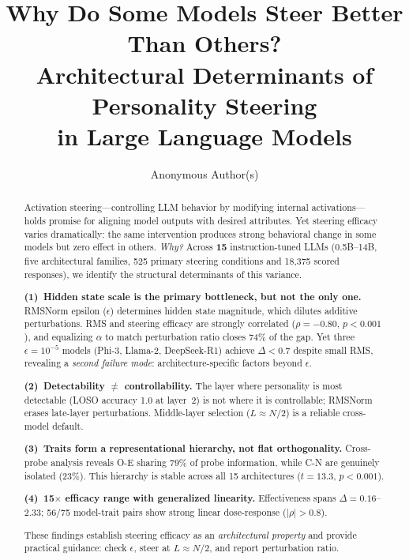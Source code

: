 \documentclass{article}
\title{Why Do Some Models Steer Better Than Others?\\Architectural Determinants of Personality Steering\\in Large Language Models}
\author{
  Anonymous Author(s) \\
}
\begin{document}
\maketitle

\begin{abstract}
Activation steering---controlling LLM behavior by modifying internal activations---holds promise for aligning model outputs with desired attributes. Yet steering efficacy varies dramatically: the same intervention produces strong behavioral change in some models but zero effect in others. \emph{Why?} Across \textbf{15} instruction-tuned LLMs (0.5B--14B, five architectural families, 525 primary steering conditions and 18{,}375 scored responses), we identify the structural determinants of this variance.

\textbf{(1)~Hidden state scale is the primary bottleneck, but not the only one.} RMSNorm epsilon ($\epsilon$) determines hidden state magnitude, which dilutes additive perturbations. RMS and steering efficacy are strongly correlated ($\rho{=}{-}0.80$, $p{<}0.001$), and equalizing $\alpha$ to match perturbation ratio closes 74\% of the gap. Yet three $\epsilon{=}10^{-5}$ models (Phi-3, Llama-2, DeepSeek-R1) achieve $\Delta{<}0.7$ despite small RMS, revealing a \emph{second failure mode}: architecture-specific factors beyond $\epsilon$.

\textbf{(2)~Detectability $\neq$ controllability.} The layer where personality is most detectable (LOSO accuracy 1.0 at layer~2) is not where it is controllable; RMSNorm erases late-layer perturbations. Middle-layer selection ($L{\approx}N/2$) is a reliable cross-model default.

\textbf{(3)~Traits form a representational hierarchy, not flat orthogonality.} Cross-probe analysis reveals O-E sharing 79\% of probe information, while C-N are genuinely isolated (23\%). This hierarchy is stable across all 15 architectures ($t{=}13.3$, $p{<}0.001$).

\textbf{(4)~15$\times$ efficacy range with generalized linearity.} Effectiveness spans $\Delta{=}0.16$--$2.33$; 56/75 model-trait pairs show strong linear dose-response ($|\rho|{>}0.8$).

These findings establish steering efficacy as an \emph{architectural property} and provide practical guidance: check $\epsilon$, steer at $L{\approx}N/2$, and report perturbation ratio.
\end{abstract}
\end{document}
